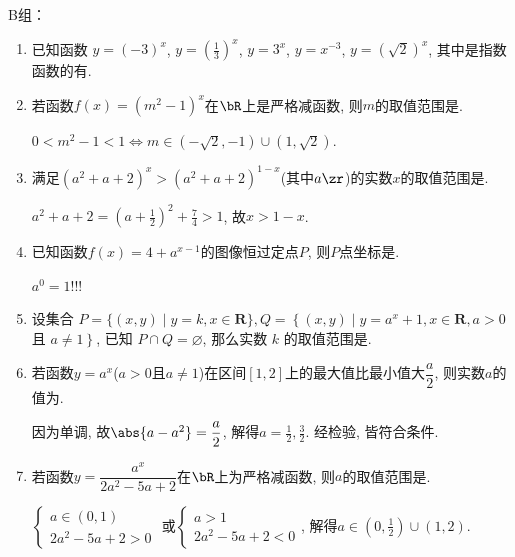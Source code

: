 B组：

\begin{enumerate}

\item 已知函数 $y=(-3)^x$,  $y=(\frac{1}{3})^x$,  $y=3^x$,  $y=x^{-3}$,  $y=(\sqrt{2})^x$, 
其中是指数函数的有. 

\item 若函数$f(x)=(m^2-1)^x$在$\bR$上是严格减函数, 则$m$的取值范围是. 
\begin{jieda}
$0<m^2-1<1\iff m\in(-\sqrt{2},-1)\cup(1,\sqrt{2})$. 
\end{jieda}

\item 满足$(a^2+a+2)^x>(a^2+a+2)^{1-x}$(其中$a\zr$)的实数$x$的取值范围是. 
\begin{jieda}
$a^2+a+2=(a+\frac{1}{2})^2+\frac{7}{4}>1$, 故$x>1-x$. 
\end{jieda}


\item 已知函数$f(x)=4+a^{x-1}$的图像恒过定点$P$, 则$P$点坐标是. 
\begin{jieda}
$a^0=1$!!!
\end{jieda}


\item 设集合 $P=\{(x, y) \mid y=k, x \in \mathbf{R}\}, Q=\left\{(x, y) \mid y=a^x+1, x \in \mathbf{R}, a>0\right.$ 且 $\left.a \neq 1\right\}$, 已知 $P \cap Q=\varnothing$, 那么实数 $k$ 的取值范围是\blkda{$(-\infty,1]$}.


\item 若函数$y=a^x$($a>0$且$a\neq1$)在区间$[1,2]$上的最大值比最小值大$\dfrac{a}{2}$, 则实数$a$的值为. 
\begin{jieda}
因为单调, 故$\abs{a-a^2}=\dfrac{a}{2}$, 解得$a=\frac{1}{2},\frac{3}{2}$. 经检验, 皆符合条件. 
\end{jieda}

\item 若函数$y=\dfrac{a^x}{2a^2-5a+2}$在$\bR$上为严格减函数, 则$a$的取值范围是. 
\begin{jieda}
$\begin{cases}
a\in(0,1)\\
2a^2-5a+2>0
\end{cases}$
或$\begin{cases}
a>1\\
2a^2-5a+2<0
\end{cases}$, 
解得$a\in(0,\frac{1}{2})\cup(1,2)$. 
\end{jieda}



\end{enumerate}
